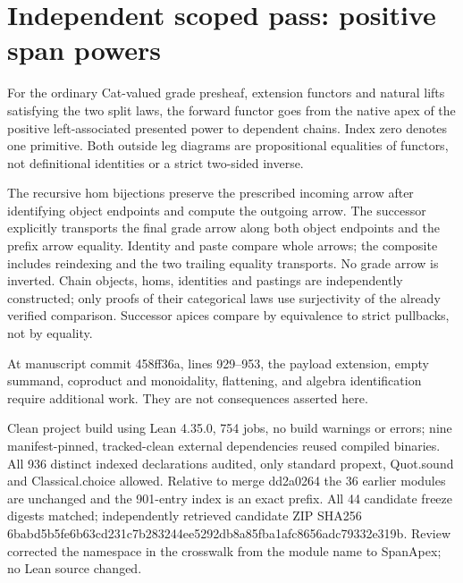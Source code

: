\documentclass{article}
\begin{document}
\section*{Independent scoped pass: positive span powers}
For the ordinary Cat-valued grade presheaf, extension functors and natural lifts satisfying the two split laws, the forward functor goes from the native apex of the positive left-associated presented power to dependent chains. Index zero denotes one primitive. Both outside leg diagrams are propositional equalities of functors, not definitional identities or a strict two-sided inverse.
\par The recursive hom bijections preserve the prescribed incoming arrow after identifying object endpoints and compute the outgoing arrow. The successor explicitly transports the final grade arrow along both object endpoints and the prefix arrow equality. Identity and paste compare whole arrows; the composite includes reindexing and the two trailing equality transports. No grade arrow is inverted. Chain objects, homs, identities and pastings are independently constructed; only proofs of their categorical laws use surjectivity of the already verified comparison. Successor apices compare by equivalence to strict pullbacks, not by equality.
\par At manuscript commit 458ff36a, lines 929--953, the payload extension, empty summand, coproduct and monoidality, flattening, and algebra identification require additional work. They are not consequences asserted here.
\par Clean project build using Lean 4.35.0, 754 jobs, no build warnings or errors; nine manifest-pinned, tracked-clean external dependencies reused compiled binaries. All 936 distinct indexed declarations audited, only standard propext, Quot.sound and Classical.choice allowed. Relative to merge dd2a0264 the 36 earlier modules are unchanged and the 901-entry index is an exact prefix. All 44 candidate freeze digests matched; independently retrieved candidate ZIP SHA256 6babd5b5fe6b63cd231c7b283244ee5292db8a85fba1afc8656adc79332e319b. Review corrected the namespace in the crosswalk from the module name to SpanApex; no Lean source changed.
\end{document}
